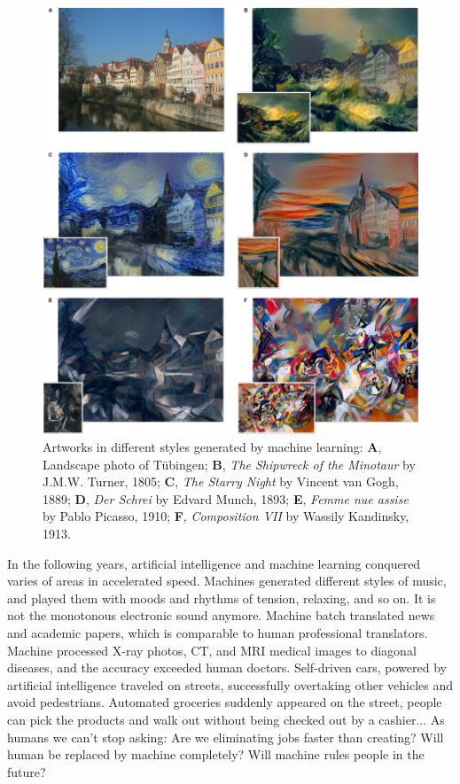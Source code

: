 \documentclass{article}
\begin{document}
\begin{figure}[htbp]
 \centering
 \includegraphics[scale=0.85]{img/style-transfer.png}
 \caption{Artworks in different styles generated by machine learning: \textbf{A}, Landscape photo of Tübingen; \textbf{B}, {\em The Shipwreck of the Minotaur} by J.M.W. Turner, 1805; \textbf{C}, {\em The Starry Night} by Vincent van Gogh, 1889; \textbf{D}, {\em Der Schrei} by Edvard Munch, 1893; \textbf{E}, {\em Femme nue assise} by Pablo Picasso, 1910; \textbf{F}, {\em Composition VII} by Wassily Kandinsky, 1913.}
 \label{fig:style-transfer}
\end{figure}

In the following years, artificial intelligence and machine learning conquered varies of areas in accelerated speed. Machines generated different styles of music, and played them with moods and rhythms of tension, relaxing, and so on. It is not the monotonous electronic sound anymore. Machine batch translated news and academic papers, which is comparable to human professional translators. Machine processed X-ray photos, CT, and MRI medical images to diagonal diseases, and the accuracy exceeded human doctors. Self-driven cars, powered by artificial intelligence traveled on streets, successfully overtaking other vehicles and avoid pedestrians. Automated groceries suddenly appeared on the street, people can pick the products and walk out without being checked out by a cashier... As humans we can't stop asking: Are we eliminating jobs faster than creating? Will human be replaced by machine completely? Will machine rules people in the future?
\end{document}
